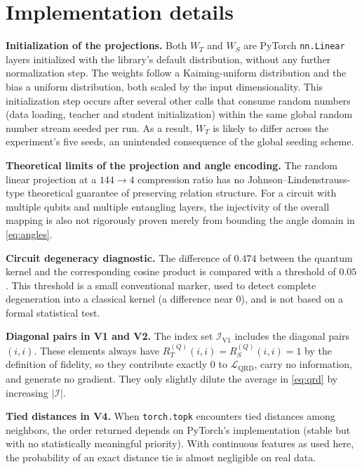 \appendix

\section{Implementation details}
\label{app:caidat}

\textbf{Initialization of the projections.} Both $W_T$ and $W_S$ are PyTorch \texttt{nn.Linear} layers initialized
with the library's default distribution, without any further normalization
step. The weights follow a Kaiming-uniform distribution and the bias a
uniform distribution, both scaled by the input dimensionality. This initialization step occurs after several
other calls that consume random numbers (data loading, teacher and
student initialization) within the same global random number stream
seeded per run. As a result, $W_T$ is likely to differ across the
experiment's five seeds, an unintended consequence of the global
seeding scheme.

\textbf{Theoretical limits of the projection and angle encoding.} The
random linear projection at a $144 \to 4$ compression ratio has no
Johnson--Lindenstrauss-type theoretical guarantee of preserving
relation structure. For a circuit with multiple qubits and multiple
entangling layers, the injectivity of the overall mapping is also not
rigorously proven merely from bounding the angle domain in
\eqref{eq:angles}.

\textbf{Circuit degeneracy diagnostic.} The difference of $0.474$
between the quantum kernel and the corresponding cosine product is
compared with a threshold of $0.05$. This threshold is a small
conventional marker, used to detect complete degeneration into a
classical kernel (a difference near 0), and is not based on a formal
statistical test.

\textbf{Diagonal pairs in V1 and V2.} The index set
$\mathcal{I}_{\mathrm{V1}}$ includes the diagonal pairs $(i,i)$. These
elements always have $R_T^{(Q)}(i,i) = R_S^{(Q)}(i,i) = 1$ by the
definition of fidelity, so they contribute exactly 0 to
$\mathcal{L}_{\mathrm{QRD}}$, carry no information, and generate no
gradient. They only slightly dilute the average in \eqref{eq:qrd} by
increasing $|\mathcal{I}|$.

\textbf{Tied distances in V4.} When \texttt{torch.topk} encounters
tied distances among neighbors, the order returned depends on
PyTorch's implementation (stable but with no statistically meaningful
priority). With continuous features as used here, the probability of
an exact distance tie is almost negligible on real data.

